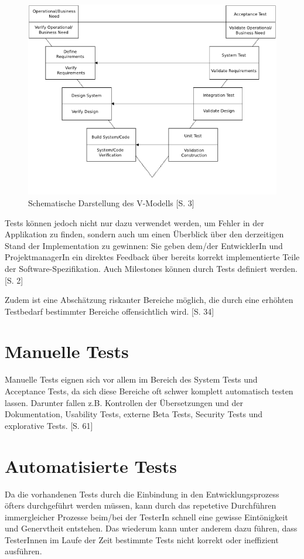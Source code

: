 \documentclass[a4paper,bibtotoc,oneside]{scrbook}
\begin{document}
\begin{figure}[h!]
\centering
\includegraphics[width=120mm]{img/vmodel.png}
\caption[Schematische Darstellung des V-Modells]{Schematische Darstellung des V-Modells \cite{vmodel}[S. 3]}\label{Abb3}
\end{figure}

Tests können jedoch nicht nur dazu verwendet werden, um Fehler in der Applikation zu finden, sondern auch um einen Überblick über den derzeitigen Stand der Implementation zu gewinnen: Sie geben dem/der EntwicklerIn und ProjektmanagerIn ein direktes Feedback über bereits korrekt implementierte Teile der Software-Spezifikation. Auch Milestones können durch Tests definiert werden. \cite{test_auto}[S. 2]

Zudem ist eine Abschätzung riskanter Bereiche möglich, die durch eine erhöhten Testbedarf bestimmter Bereiche offensichtlich wird. \cite{testing_apps_on_web}[S. 34]


\section{Manuelle Tests}
Manuelle Tests eignen sich vor allem im Bereich des System Tests und Acceptance Tests, da sich diese Bereiche oft schwer komplett automatisch testen lassen. Darunter fallen z.B. Kontrollen der Übersetzungen und der Dokumentation, Usability Tests, externe Beta Tests, Security Tests und explorative Tests. \cite{test_large_systems}[S. 61]


\section{Automatisierte Tests}
Da die vorhandenen Tests durch die Einbindung in den Entwicklungsprozess öfters durchgeführt werden müssen, kann durch das repetetive Durchführen immergleicher Prozesse beim/bei der TesterIn schnell eine gewisse Eintönigkeit und Genervtheit entstehen. Das wiederum kann unter anderem dazu führen, dass TesterInnen im Laufe der Zeit bestimmte Tests nicht korrekt oder ineffizient ausführen. 
\end{document}
